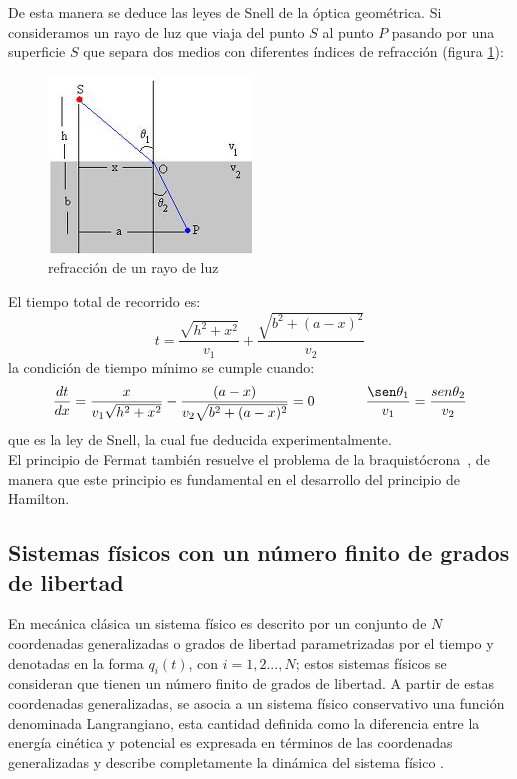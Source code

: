 \documentclass[a4paper,12pt]{article}
\begin{document}
\begin{center}
\end{center}
De esta manera se deduce las leyes de Snell de la óptica geométrica. Si \mbox{consideramos} un rayo de luz que viaja del punto $S$ al punto $P$ pasando por una superficie $S$ que separa dos medios con diferentes índices de refracción (figura \ref{fermat}):
\begin{figure}[H]
\centering
\includegraphics[width=0.3 \textwidth]{snell.jpg}
\caption{refracción de un rayo de luz}
\label{fermat}
\end{figure} 
El tiempo total de recorrido es:
\begin{equation}
t=\frac{\sqrt{h^2+x^2}}{v_1}+\frac{\sqrt{b^2+(a-x)^2}}{v_2} 
\end{equation}
la condición de tiempo mínimo se cumple cuando:
\begin{equation}
\frac{dt}{dx}=\frac{x}{v_1\sqrt{h^2+x^2}}-\frac{(a-x)}{v_2\sqrt{b^2+(a-x)^2}}=0\ \ \ \ \ \ \ \ \ \ \ \frac{\sen \theta_1}{v_1}=\frac{sen \theta_2}{v_2}
\end{equation}
que es la ley de Snell, la cual fue deducida experimentalmente.
\\

El principio de Fermat también resuelve el problema de la \mbox{braquistócrona \cite{ecudif}}, de manera que este principio es fundamental en el desarrollo del principio de Hamilton.
\subsection{Sistemas físicos con un número finito de grados de libertad}
En mecánica clásica un sistema físico es descrito por un conjunto de $N$ coordenadas generalizadas o grados de libertad parametrizadas por el tiempo y denotadas en la forma $q_i(t)$, con $i=1,2...,N$; estos sistemas físicos se consideran que tienen un número finito de grados de libertad. A partir de estas coordenadas generalizadas, se asocia a un sistema físico conservativo una función denominada Langrangiano, esta cantidad definida como la diferencia entre la energía cinética y potencial es expresada en términos de las coordenadas generalizadas y describe completamente la dinámica del sistema físico \cite{hamilton}.
\\
\end{document}
